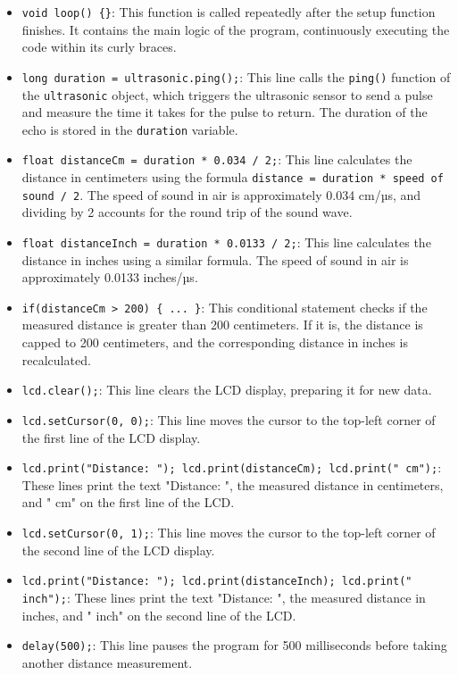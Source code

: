 \documentclass{article}
\begin{document}
\begin{itemize}
    \item \texttt{void loop() \{\}}: This function is called repeatedly after the setup function finishes. It contains the main logic of the program, continuously executing the code within its curly braces.
    \item \texttt{long duration = ultrasonic.ping();}: This line calls the \texttt{ping()} function of the \texttt{ultrasonic} object, which triggers the ultrasonic sensor to send a pulse and measure the time it takes for the pulse to return. The duration of the echo is stored in the \texttt{duration} variable.
    \item \texttt{float distanceCm = duration * 0.034 / 2;}: This line calculates the distance in centimeters using the formula \texttt{distance = duration * speed of sound / 2}. The speed of sound in air is approximately 0.034 cm/µs, and dividing by 2 accounts for the round trip of the sound wave.
    \item \texttt{float distanceInch = duration * 0.0133 / 2;}: This line calculates the distance in inches using a similar formula. The speed of sound in air is approximately 0.0133 inches/µs.
    \item \texttt{if(distanceCm > 200) \{ ... \}}: This conditional statement checks if the measured distance is greater than 200 centimeters. If it is, the distance is capped to 200 centimeters, and the corresponding distance in inches is recalculated.
    \item \texttt{lcd.clear();}: This line clears the LCD display, preparing it for new data.
    \item \texttt{lcd.setCursor(0, 0);}: This line moves the cursor to the top-left corner of the first line of the LCD display.
    \item \texttt{lcd.print("Distance: "); lcd.print(distanceCm); lcd.print(" cm");}: These lines print the text "Distance: ", the measured distance in centimeters, and " cm" on the first line of the LCD.
    \item \texttt{lcd.setCursor(0, 1);}: This line moves the cursor to the top-left corner of the second line of the LCD display.
    \item \texttt{lcd.print("Distance: "); lcd.print(distanceInch); lcd.print(" inch");}: These lines print the text "Distance: ", the measured distance in inches, and " inch" on the second line of the LCD.
    \item \texttt{delay(500);}: This line pauses the program for 500 milliseconds before taking another distance measurement. 
\end{itemize}
\end{document}
